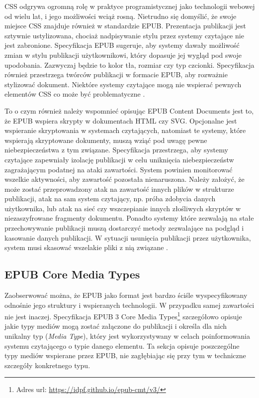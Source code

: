 CSS odgrywa ogromną rolę w praktyce programistycznej jako technologii webowej od wielu lat, i jego możliwości wciąż rosną. Nietrudno się domyślić, że swoje miejsce CSS znajduje również w standardzie EPUB. Prezentacja publikacji jest sztywnie ustylizowana, chociaż nadpisywanie stylu przez systemy czytające nie jest zabronione. Specyfikacja EPUB sugeruje, aby systemy dawały możliwość zmian w stylu publikacji użytkownikowi, który dopasuje jej wygląd pod swoje upodobania. Zazwyczaj będzie to kolor tła, rozmiar czy typ czcionki. Specyfikacja również przestrzega twórców publikacji w formacie EPUB, aby rozważnie stylizować dokument. Niektóre systemy czytające mogą nie wspierać pewnych elementów CSS co może być problematyczne \cite{EPUBContentDocumentsSpecificationCSS}.

To o czym również należy wspomnieć opisując EPUB Content Documents jest to, że EPUB wspiera skrypty w dokumentach HTML czy SVG. Opcjonalne jest wspieranie skryptowania w systemach czytających, natomiast te systemy, które wspierają skryptowane dokumenty, muszą wziąć pod uwagę pewne niebezpieczeństwa z tym związane. Specyfikacja przestrzega, aby systemy czytające zapewniały izolację publikacji w celu uniknięcia niebezpieczeństw zagrażającym podatnej na ataki zawartości. System powinien monitorować wszelkie aktywności, aby zawartość pozostała nienaruszona. Należy założyć, że może zostać przeprowadzony atak na zawartość innych plików w strukturze publikacji, atak na sam system czytający, np. próba zdobycia danych użytkownika, lub atak na sieć czy wszczepianie innych złośliwych skryptów w niezaszyfrowane fragmenty dokumentu. Ponadto systemy które zezwalają na stałe przechowywanie publikacji muszą dostarczyć metody zezwalające na podgląd i kasowanie danych publikacji. W sytuacji usunięcia publikacji przez użytkownika, system musi skasować wszelakie pliki z nią związane \cite{EPUBContentDocumentsSpecificationJS}.

\subsection{EPUB Core Media Types}

Zaobserwować można, że EPUB jako format jest bardzo ściśle wyspecyfikowany odnośnie jego struktury i wspieranych technologii. W przypadku samej zawartości nie jest inaczej. Specyfikacja EPUB 3 Core Media Types\footnote{Adres url: \href{https://idpf.github.io/epub-cmt/v3/}{https://idpf.github.io/epub-cmt/v3/}} szczegółowo opisuje jakie typy mediów mogą zostać załączone do publikacji i określa dla nich unikalny typ (\textit{Media Type}), który jest wykorzystywany w celach poinformowania systemu czytającego o typie danego elementu. Ta sekcja opisuje poszczególne typy mediów wspierane przez EPUB, nie zagłębiając się przy tym w techniczne szczegóły konkretnego typu.

